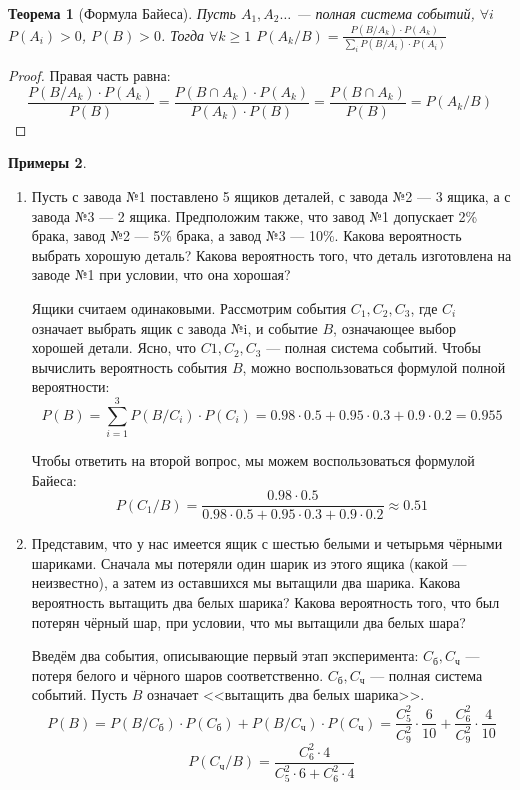 \documentclass[11pt,openany,a4paper]{scrartcl}
\theoremstyle{plain}
\newtheorem{theorem}{Теорема}[subsection]
\theoremstyle{definition}
\newtheorem{examples}[theorem]{Примеры}
\begin{document}
\begin{theorem}[Формула Байеса]
    Пусть $A_1, A_2 \ldots$ — полная система событий, $\forall i$ $P(A_i) > 0$, 
    $P(B) > 0$. Тогда $\forall k \geqslant 1$ $P(A_k/B) =
    \frac{P(B/A_k) \cdot P(A_k)}{\sum\limits_i P(B/A_i) \cdot P(A_i)}$
\end{theorem}
\begin{proof}
    Правая часть равна:
    $$
    \frac{P(B/A_k) \cdot P(A_k)}{P(B)} =
    \frac{P(B \cap A_k) \cdot P(A_k)}{P(A_k) \cdot P(B)} =
    \frac{P(B \cap A_k)}{P(B)} = P(A_k/B)
    $$
\end{proof}
\begin{examples}
    \begin{enumerate}
        \item Пусть с завода №1 поставлено 5 ящиков деталей, с завода №2 — 3 ящика,
        а с завода №3 — 2 ящика. Предположим также, что завод №1 допускает 2\% брака,
        завод №2 — 5\% брака, а завод №3 — 10\%. Какова вероятность выбрать хорошую
        деталь? Какова вероятность того, что деталь изготовлена на заводе №1 при
        условии, что она хорошая?
        
        Ящики считаем одинаковыми. Рассмотрим события $C_1, C_2, C_3$, где $C_i$
        означает выбрать ящик с завода №i, и событие $B$, означающее выбор хорошей 
        детали. Ясно, что $C1, C_2, C_3$ — полная система событий. Чтобы вычислить 
        вероятность события $B$, можно воспользоваться формулой полной вероятности:
        $$
        P(B) = \sum_{i = 1}^3 P(B/C_i) \cdot P(C_i) = 
        0.98 \cdot 0.5 + 0.95 \cdot 0.3 + 0.9 \cdot 0.2 = 0.955
        $$
        
        Чтобы ответить на второй вопрос, мы можем воспользоваться формулой Байеса:
        $$
        P(C_1/B) = \frac{0.98 \cdot 0.5}
        {0.98 \cdot 0.5 + 0.95 \cdot 0.3 + 0.9 \cdot 0.2} \approx 0.51
        $$
        
        \item Представим, что у нас имеется ящик с шестью белыми и четырьмя чёрными 
        шариками. Сначала мы потеряли один шарик из этого ящика (какой — неизвестно),
        а затем из оставшихся мы вытащили два шарика. Какова вероятность вытащить
        два белых шарика? Какова вероятность того, что был потерян чёрный шар, при
        условии, что мы вытащили два белых шара?
        
        Введём два события, описывающие первый этап эксперимента: $C_{б}, C_{ч}$ — потеря
        белого и чёрного шаров соответственно. $C_{б}, C_{ч}$ — полная система событий.
        Пусть $B$ означает <<вытащить два белых шарика>>.
        $$
        P(B) = P(B/C_{б}) \cdot P(C_{б}) + P(B/C_{ч}) \cdot P(C_{ч}) =
        \frac{C_5^2}{C_9^2} \cdot \frac{6}{10} + \frac{C_6^2}{C_9^2} \cdot \frac{4}{10}
        $$
        $$
        P(C_{ч}/B) = \frac{C_6^2 \cdot 4}{C_5^2 \cdot 6 + C_6^2 \cdot 4}
        $$
    \end{enumerate}
\end{examples}
\end{document}
